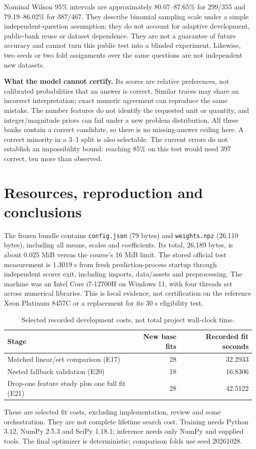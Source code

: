 \documentclass[11pt,a4paper]{article}
\newcommand{\code}[1]{\texttt{\small #1}}
\newcommand{\pageheading}[1]{\section{#1}}
\begin{document}
Nominal Wilson 95\% intervals are approximately 80.07--87.65\% for 299/355 and
79.19--86.02\% for 387/467. They describe binomial sampling scale under a simple
independent-question assumption; they do not account for adaptive development,
public-bank reuse or dataset dependence. They are not a guarantee of future
accuracy and cannot turn this public test into a blinded experiment. Likewise,
two seeds or two fold assignments over the same questions are not independent
new datasets.

\textbf{What the model cannot certify.} Its scores are relative preferences,
not calibrated probabilities that an answer is correct. Similar traces may
share an incorrect interpretation; exact numeric agreement can reproduce the
same mistake. The number features do not identify the requested unit or quantity,
and integer/magnitude priors can fail under a new problem distribution. All
these banks contain a correct candidate, so there is no missing-answer ceiling
here. A correct minority in a 3--1 split is also selectable. The current errors
do not establish an impossibility bound: reaching 85\% on this test would need
397 correct, ten more than observed.

\newpage
\pageheading{Resources, reproduction and conclusions}
The frozen bundle contains \code{config.json} (79 bytes) and
\code{weights.npz} (26,110 bytes), including all means, scales and coefficients.
Its total, 26,189 bytes, is about 0.025 MiB versus the course's 16 MiB limit.
The stored official test measurement is 1.3019 s from fresh prediction-process
startup through independent scorer exit, including imports, data/assets and
preprocessing. The machine was an Intel Core i7-12700H on Windows 11, with four
threads set across numerical libraries. This is local evidence, not certification
on the reference Xeon Platinum 8457C or a replacement for its 30 s eligibility test.

\begin{table}[h]\centering\small
\caption{Selected recorded development costs, not total project wall-clock time.}
\begin{tabular}{lrr}\toprule
Stage & New base fits & Recorded fit seconds \\\midrule
Matched linear/set comparison (E17) & 28 & 32.2933 \\
Nested fallback validation (E20) & 18 & 16.8306 \\
Drop-one feature study plus one full fit (E21) & 28 & 42.5122 \\
\bottomrule\end{tabular}
\end{table}
These are selected fit costs, excluding implementation, review and some
orchestration. They are not complete lifetime search cost. Training needs Python
3.12, NumPy 2.5.3 and SciPy 1.18.1; inference needs only NumPy and supplied tools.
The final optimizer is deterministic; comparison folds use seed 20261028.
\end{document}
